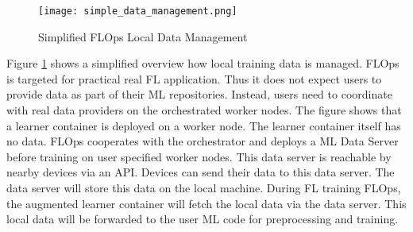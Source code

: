 \begin{figure}[h]
    \centering
    \texttt{[image: simple\_data\_management.png]}
    \caption{Simplified FLOps Local Data Management}
    \label{fig:flops_simple_data_management}
\end{figure}

Figure \ref{fig:flops_simple_data_management} shows a simplified overview how local training data is managed.
FLOps is targeted for practical real FL application.
Thus it does not expect users to provide data as part of their ML repositories.
Instead, users need to coordinate with real data providers on the orchestrated worker nodes.
The figure shows that a learner container is deployed on a worker node.
The learner container itself has no data. 
FLOps cooperates with the orchestrator and deploys a ML Data Server before training on user specified worker nodes.
This data server is reachable by nearby devices via an API.
Devices can send their data to this data server.
The data server will store this data on the local machine.
During FL training FLOps, the augmented learner container will fetch the local data via the data server.
This local data will be forwarded to the user ML code for preprocessing and training.

